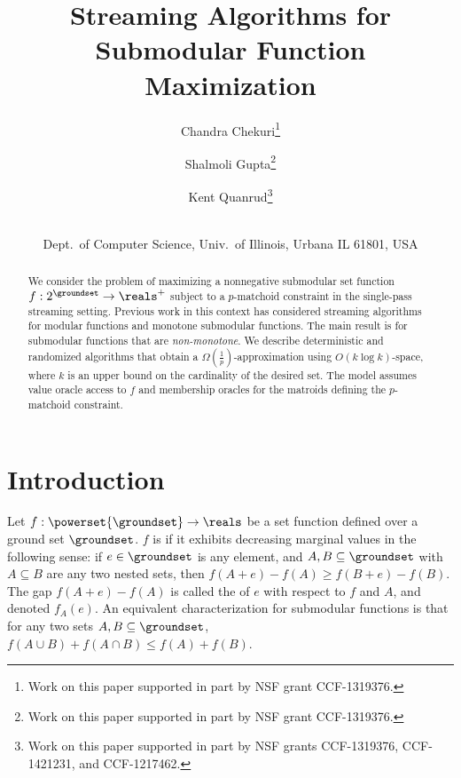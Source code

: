 \documentclass[oneside,letterpaper]{scrartcl} \usepackage{macros}
\begin{document}
\title{Streaming Algorithms for \\Submodular Function Maximization} \author{ Chandra Chekuri\thanks{ Work on this paper supported in part by NSF grant
    CCF-1319376.  } \and Shalmoli Gupta\thanks{Work on this paper supported in part by NSF grant
    CCF-1319376.  }\and Kent Quanrud\thanks{Work on this paper supported in part by NSF grants CCF-1319376,
    CCF-1421231, and CCF-1217462.  } \and
  \\
  Dept.\ of Computer Science, Univ.\ of Illinois, Urbana IL 61801, USA \\
   } 

\maketitle

\begin{abstract}
  We consider the problem of maximizing a nonnegative submodular set
  function $f:2^{\groundset} \rightarrow \reals^+$ subject to a
  $p$-matchoid constraint in the single-pass streaming
  setting. Previous work in this context has considered streaming
  algorithms for modular functions and monotone submodular
  functions. The main result is for submodular functions that are {\em
    non-monotone}. We describe deterministic and randomized algorithms
  that obtain a $\Omega(\frac{1}{p})$-approximation using $O(k \log
  k)$-space, where $k$ is an upper bound on the cardinality of the
  desired set. The model assumes value oracle access to $f$ and
  membership oracles for the matroids defining the $p$-matchoid
  constraint.
\end{abstract}

\section{Introduction}


Let $f: \powerset{\groundset} \to \reals$ be a set function defined
over a ground set $\groundset$. $f$ is  if it
exhibits decreasing marginal values in the following sense: if $e \in
\groundset$ is any element, and $A,B \subseteq \groundset$ with $A
\subseteq B$ are any two nested sets, then $f(A + e) - f(A) \geq f(B +
e) - f(B)$. The gap $f(A+e) - f(A)$ is called the  of $e$ with respect to $f$ and $A$, and denoted $f_A(e)$. An
equivalent characterization for submodular functions is that for any
two sets $A,B \subseteq \groundset$, $f(A \cup B) + f(A \cap B) \leq
f(A) + f(B)$. 
\end{document}
